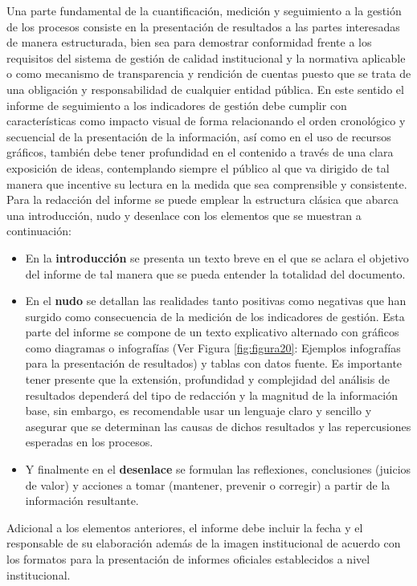 \documentclass[
]{book}
\begin{document}
Una parte fundamental de la cuantificación, medición y seguimiento a la gestión de los procesos consiste en la presentación de resultados a las partes interesadas de manera estructurada, bien sea para demostrar conformidad frente a los requisitos del sistema de gestión de calidad institucional y la normativa aplicable o como mecanismo de transparencia y rendición de cuentas puesto que se trata de una obligación y responsabilidad de cualquier entidad pública. En este sentido el informe de seguimiento a los indicadores de gestión debe cumplir con características como impacto visual de forma relacionando el orden cronológico y secuencial de la presentación de la información, así como en el uso de recursos gráficos, también debe tener profundidad en el contenido a través de una clara exposición de ideas, contemplando siempre el público al que va dirigido de tal manera que incentive su lectura en la medida que sea comprensible y consistente. Para la redacción del informe se puede emplear la estructura clásica que abarca una introducción, nudo y desenlace con los elementos que se muestran a continuación:

\begin{itemize}
\item
  En la \textbf{introducción} se presenta un texto breve en el que se aclara el objetivo del informe de tal manera que se pueda entender la totalidad del documento.
\item
  En el \textbf{nudo} se detallan las realidades tanto positivas como negativas que han surgido como consecuencia de la medición de los indicadores de gestión. Esta parte del informe se compone de un texto explicativo alternado con gráficos como diagramas o infografías (Ver Figura \ref{fig:figura20}: Ejemplos infografías para la presentación de resultados) y tablas con datos fuente. Es importante tener presente que la extensión, profundidad y complejidad del análisis de resultados dependerá del tipo de redacción y la magnitud de la información base, sin embargo, es recomendable usar un lenguaje claro y sencillo y asegurar que se determinan las causas de dichos resultados y las repercusiones esperadas en los procesos.
\item
  Y finalmente en el \textbf{desenlace} se formulan las reflexiones, conclusiones (juicios de valor) y acciones a tomar (mantener, prevenir o corregir) a partir de la información resultante.
\end{itemize}

Adicional a los elementos anteriores, el informe debe incluir la fecha y el responsable de su elaboración además de la imagen institucional de acuerdo con los formatos para la presentación de informes oficiales establecidos a nivel institucional.
\end{document}
